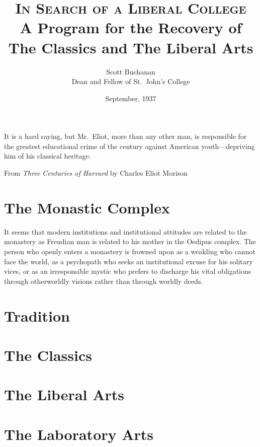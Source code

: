 \documentclass{memoir}
\title{\textsc{In Search of a Liberal College}\\ A Program for the Recovery of The Classics and The Liberal Arts}
\author{Scott Buchanan\\ Dean and Fellow of St.\ John's College}
\date{September, 1937}
\begin{document}
\maketitle

\epigraph{It is a hard saying, but Mr.\ Eliot, more than any other man, is responsible for the greatest educational crime of the century against American youth---depriving him of his classical heritage.}{From \emph{Three Centuries of Harvard} by Charles Eliot Morison}

\tableofcontents*


\chapter{The Monastic Complex}

It seems that modern institutions and institutional attitudes are
related to the monastery as Freudian man is related to his mother
in the Oedipus complex. The person who openly enters a monastery is
frowned upon as a weakling who cannot face the world, as a psychopath
who seeks an institutional excuse for his solitary vices, or as an
irresponsible mystic who prefers to discharge his vital obligations
through otherworldly visions rather than through worldly deeds.

\chapter{Tradition}
\chapter{The Classics}
\chapter{The Liberal Arts}
\chapter{The Laboratory Arts}
\end{document}
